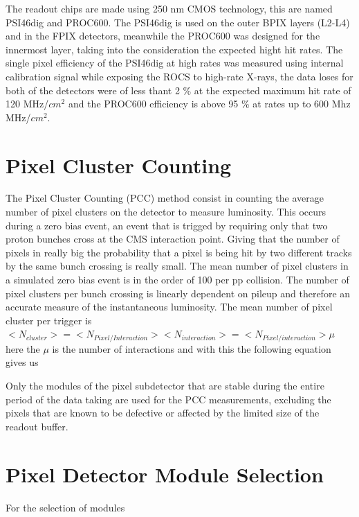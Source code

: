 The readout chips are made using 250 nm CMOS technology, this are named PSI46dig and PROC600. The PSI46dig is used on the outer BPIX layers (L2-L4) and in the FPIX detectors, meanwhile the PROC600 was designed for the innermost layer, taking into the consideration the expected hight hit rates. The single pixel efficiency of the PSI46dig at high rates was measured using internal calibration signal while exposing the ROCS to high-rate X-rays, the data loses for both of the detectors were of less thant 2 \% at the expected maximum hit rate of 120 MHz/$cm^{2}$ and the PROC600 efficiency is above 95 \% at rates up to 600 Mhz MHz/$cm^{2}$.

\section{Pixel Cluster Counting}

The Pixel Cluster Counting (PCC) method consist in counting the average number of pixel clusters on the detector to measure luminosity. This occurs during a zero bias event, an event that is trigged by requiring only that two proton bunches cross at the CMS interaction point. Giving that the number of pixels in really big the probability that a pixel is being hit by two different tracks by the same bunch crossing is really small. The mean number of pixel clusters in a simulated zero bias event is in the order of 100 per pp collision. The number of pixel clusters per bunch crossing is linearly dependent on pileup and therefore an accurate measure of the instantaneous luminosity. The mean number of pixel cluster per trigger is \\ 

$<N_{cluster}> = <N_{Pixel/Interaction}> <N_{interaction}> = <N_{Pixel/interaction}> \mu$ \\

here the $\mu$ is the number of interactions and with this the following equation gives us 

Only the modules of the pixel subdetector that are stable during the entire period of the data taking are used for the PCC measurements, excluding the pixels that are known to be defective or affected by the limited size of the readout buffer. 

\section{Pixel Detector Module Selection}

For the selection of modules 




